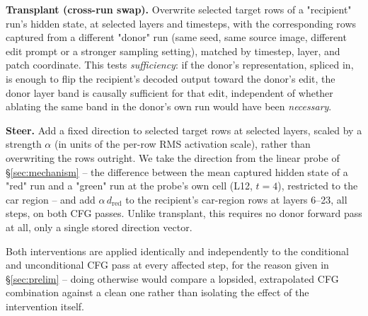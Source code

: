 \documentclass[10pt,twocolumn]{article}
\begin{document}
\textbf{Transplant (cross-run swap).} Overwrite selected target rows of
a "recipient" run's hidden state, at selected layers and timesteps, with
the corresponding rows captured from a different "donor" run (same
seed, same source image, different edit prompt or a stronger sampling
setting), matched by timestep, layer, and patch coordinate. This tests
\emph{sufficiency}: if the donor's representation, spliced in, is enough
to flip the recipient's decoded output toward the donor's edit, the
donor layer band is causally sufficient for that edit, independent of
whether ablating the same band in the donor's own run would have been
\emph{necessary}.

\textbf{Steer.} Add a fixed direction to selected target rows at
selected layers, scaled by a strength $\alpha$ (in units of the
per-row RMS activation scale), rather than overwriting the rows
outright. We take the direction from the linear probe of
\S\ref{sec:mechanism} -- the difference between the mean captured
hidden state of a "red" run and a "green" run at the probe's own
cell (L12, $t{=}4$), restricted to the car region -- and add
$\alpha\,d_{\text{red}}$ to the recipient's car-region rows at layers
6--23, all steps, on both CFG passes. Unlike transplant, this requires
no donor forward pass at all, only a single stored direction vector.

Both interventions are applied identically and independently to the
conditional and unconditional CFG pass at every affected step, for the
reason given in \S\ref{sec:prelim} -- doing otherwise would compare a
lopsided, extrapolated CFG combination against a clean one rather than
isolating the effect of the intervention itself.
\end{document}
